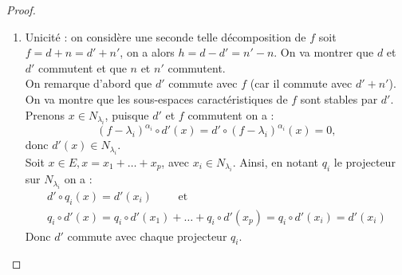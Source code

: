 \begin{proof}
\begin{enumerate}
\begin{gather*}
\begin{pmatrix}
 & \ddots & \\
0 & & \begin{pmatrix} 
\lambda_p & & 0 \\
 & \ddots & \\
0 & & \lambda_p \\
\end{pmatrix} 
\end{pmatrix} 
+ \begin{pmatrix} 
\begin{pmatrix} 
0 & & * \\
 & \ddots & \\
0 & & 0 \\
\end{pmatrix} & 0 \\
 & \ddots & \\
0 & & \begin{pmatrix} 
0 & & * \\
 & \ddots & \\
0 & & 0 \\
\end{pmatrix} 
\end{pmatrix} 
\end{gather*}

En notant $D$ la première matrice et $N$ la seconde, on a $A = D + N$ et soient $d$ et $n$ les endomorphismes de $E$ qui, 
dans la base $B$ sont représentés par $D$ et $N$ respectivement. 
ses endomorphises sont respectivement diagonalisable et nilpotent et ils commutent 
(les matrices $D$ et $N$ commutent, on le démontre en effectuant un produit par bloc).
On a donc démontré l'existence.

\item Unicité : on considère une seconde telle décomposition de $f$ soit $f = d + n = d' + n'$, on a alors $h = d - d' = n' - n$. 
On va montrer que $d$ et $d'$ commutent et que $n$ et $n'$ commutent. \\

On remarque d'abord que $d'$ commute avec $f$ (car il commute avec $d'+n'$). 
On va montre que les sous-espaces caractéristiques de $f$ sont stables par $d'$. \\
Prenons $x \in N_{\lambda_i}$, puisque $d'$ et $f$ commutent on a :
\[ (f-\lambda_i)^{\alpha_i} \circ d'(x) = d' \circ (f-\lambda_i)^{\alpha_i} (x) = 0 , \]
donc $d'(x) \in N_{\lambda_i}$. \\

Soit $x \in E, x= x_1 + \dots + x_p$, avec $x_i \in N_{\lambda_i}$.
Ainsi, en notant $q_i$ le projecteur sur $N_{\lambda_i}$ on a : 
\begin{gather*}
d' \circ q_i(x) = d'(x_i) \qquad \text{ et} \\
q_i \circ d'(x) = q_i \circ d'(x_1) + \dots + q_i \circ d'(x_p) = q_i \circ d'(x_i) = d'(x_i)
\end{gather*}
Donc $d'$ commute avec chaque projecteur $q_i$. \\


\end{enumerate}
\end{proof}

